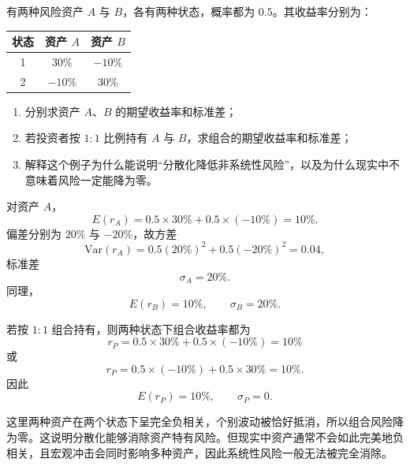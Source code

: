 \begin{question}
有两种风险资产 $A$ 与 $B$，各有两种状态，概率都为 $0.5$。其收益率分别为：

\begin{center}
\begin{tabular}{c|cc}
状态 & 资产 $A$ & 资产 $B$\\ \hline
1 & $30\%$ & $-10\%$\\
2 & $-10\%$ & $30\%$
\end{tabular}
\end{center}

\begin{enumerate}[label=(\arabic*),leftmargin=2.5em]
  \item 分别求资产 $A$、$B$ 的期望收益率和标准差；
  \item 若投资者按 $1:1$ 比例持有 $A$ 与 $B$，求组合的期望收益率和标准差；
  \item 解释这个例子为什么能说明“分散化降低非系统性风险”，以及为什么现实中不意味着风险一定能降为零。
\end{enumerate}

\begin{solution}
对资产 $A$，
\[
E(r_A)=0.5\times 30\%+0.5\times(-10\%)=10\%.
\]
偏差分别为 $20\%$ 与 $-20\%$，故方差
\[
\mathrm{Var}(r_A)=0.5(20\%)^2+0.5(-20\%)^2=0.04,
\]
标准差
\[
\sigma_A=20\%.
\]
同理，
\[
E(r_B)=10\%,\qquad \sigma_B=20\%.
\]

若按 $1:1$ 组合持有，则两种状态下组合收益率都为
\[
r_P=0.5\times 30\%+0.5\times (-10\%)=10\%
\]
或
\[
r_P=0.5\times (-10\%)+0.5\times 30\%=10\%.
\]
因此
\[
E(r_P)=10\%,\qquad \sigma_P=0.
\]

这里两种资产在两个状态下呈完全负相关，个别波动被恰好抵消，所以组合风险降为零。这说明分散化能够消除资产特有风险。但现实中资产通常不会如此完美地负相关，且宏观冲击会同时影响多种资产，因此系统性风险一般无法被完全消除。
\end{solution}
\end{question}

